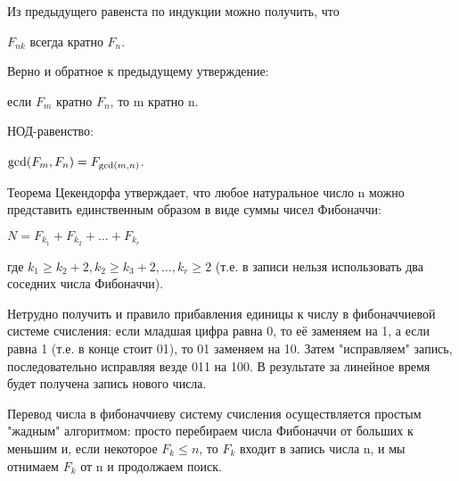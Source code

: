 \documentclass[a4paper]{article}
\begin{document}
\begin{multicols*}{2}
		 Из предыдущего равенста по индукции можно получить, что
		 
		 $F_{nk}$ всегда кратно $F_n$.
		 
		 Верно и обратное к предыдущему утверждение:
		 
		 если $F_m$ кратно $F_n$, то m кратно n.
		 
		 НОД-равенство:
		 
		 ${\rm gcd} (F_m, F_n) = F_{{\rm gcd} (m, n)}$. 
		 
		 Теорема Цекендорфа утверждает, что любое натуральное число n можно представить единственным образом в виде суммы чисел Фибоначчи:
		 
		 $N = F_{k_1} + F_{k_2} + \ldots + F_{k_r}$
		 
		 где $k_1 \ge k_2+2, k_2 \ge k_3+2, \ldots, k_r \ge 2$ (т.е. в записи нельзя использовать два соседних числа Фибоначчи).
		 
		 Нетрудно получить и правило прибавления единицы к числу в фибоначчиевой системе счисления: если младшая цифра равна 0, то её заменяем на 1, а если равна 1 (т.е. в конце стоит 01), то 01 заменяем на 10. Затем "исправляем" запись, последовательно исправляя везде 011 на 100. В результате за линейное время будет получена запись нового числа.
		 
		 Перевод числа в фибоначчиеву систему счисления осуществляется простым "жадным" алгоритмом: просто перебираем числа Фибоначчи от больших к меньшим и, если некоторое $F_k \le n$, то $F_k$ входит в запись числа n, и мы отнимаем $F_k$ от n и продолжаем поиск.
		 
		 
	\end{multicols*}
\end{document}
